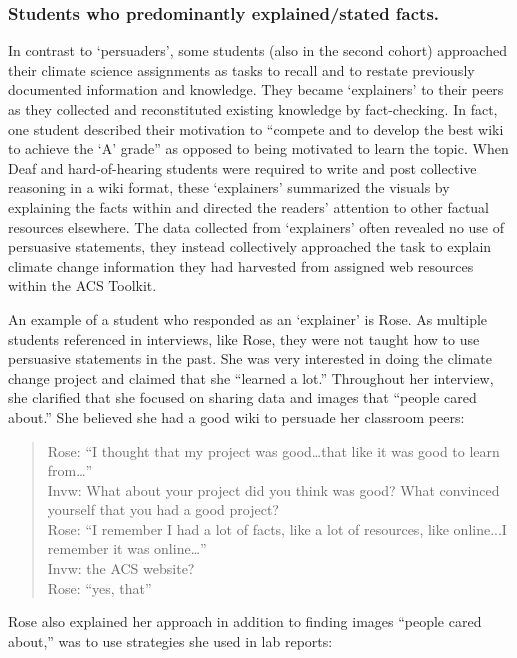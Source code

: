 \documentclass[11.5pt]{sig-alternate} %
\begin{document}
\begin{large}
\subsubsection*{Students who predominantly explained/stated facts.}

In contrast to ‘persuaders’, some students (also in the second cohort) approached their climate science assignments as tasks to recall and to restate previously documented information and knowledge. They became ‘explainers’ to their peers as they collected and reconstituted existing knowledge by fact-checking. In fact, one student described their motivation to “compete and to develop the best wiki to achieve the ‘A’ grade” as opposed to being motivated to learn the topic. When Deaf and hard-of-hearing students were required to write and post collective reasoning in a wiki format, these ‘explainers’ summarized the visuals by explaining the facts within and directed the readers’ attention to other factual resources elsewhere. The data collected from ‘explainers’ often revealed no use of persuasive statements, they instead collectively approached the task to explain climate change information they had harvested from assigned web resources within the ACS Toolkit. 

An example of a student who responded as an ‘explainer’ is Rose. As multiple students referenced in interviews, like Rose, they were not taught how to use persuasive statements in the past. She was very interested in doing the climate change project and claimed that she “learned a lot.” Throughout her interview, she clarified that she focused on sharing data and images that “people cared about.” She believed she had a good wiki to persuade her classroom peers:

\begin{quote}
    Rose: “I thought that my project was good…that like it was good to learn from…” \\
Invw: What about your project did you think was good? What convinced yourself that you had a good project? \\
Rose: “I remember I had a lot of facts, like a lot of resources, like online...I remember it was online…” \\
Invw: the ACS website? \\
Rose: “yes, that”
\end{quote}

Rose also explained her approach in addition to finding images “people cared about,” was to use strategies she used in lab reports:


\end{large}
\end{document}
